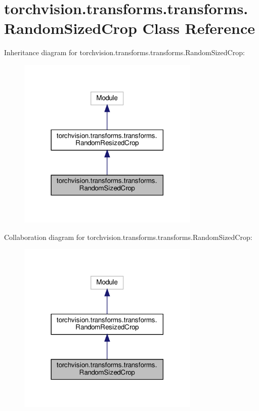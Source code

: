 \hypertarget{classtorchvision_1_1transforms_1_1transforms_1_1RandomSizedCrop}{}\section{torchvision.\+transforms.\+transforms.\+Random\+Sized\+Crop Class Reference}
\label{classtorchvision_1_1transforms_1_1transforms_1_1RandomSizedCrop}


Inheritance diagram for torchvision.\+transforms.\+transforms.\+Random\+Sized\+Crop\+:
\nopagebreak
\begin{figure}[H]
\begin{center}
\leavevmode
\includegraphics[width=246pt]{classtorchvision_1_1transforms_1_1transforms_1_1RandomSizedCrop__inherit__graph}
\end{center}
\end{figure}


Collaboration diagram for torchvision.\+transforms.\+transforms.\+Random\+Sized\+Crop\+:
\nopagebreak
\begin{figure}[H]
\begin{center}
\leavevmode
\includegraphics[width=246pt]{classtorchvision_1_1transforms_1_1transforms_1_1RandomSizedCrop__coll__graph}
\end{center}
\end{figure}
